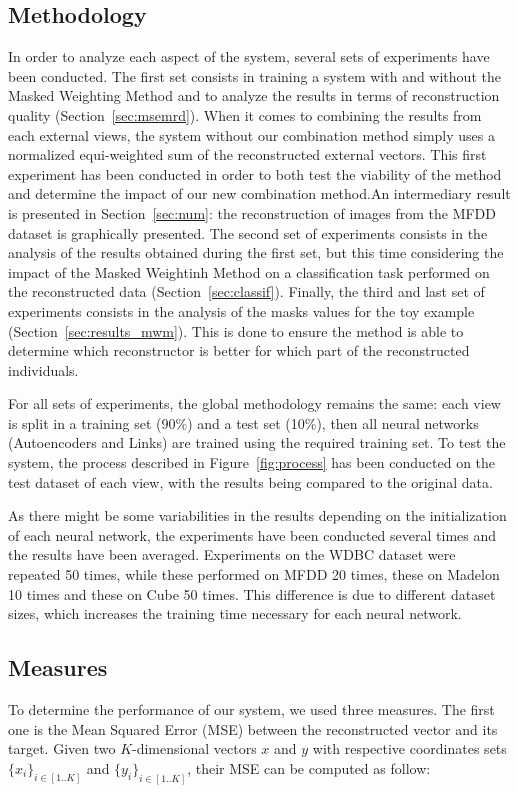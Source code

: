 	\subsection{Methodology}
\label{sec:methodo}
In order to analyze each aspect of the system, several sets of experiments have been conducted.	The first set consists in training a system with and without the Masked Weighting Method and to analyze the results in terms of reconstruction quality (Section~\ref{sec:msemrd}). When it comes to combining the results from each external views, the system without our combination method simply uses a normalized equi-weighted sum of the reconstructed external vectors. This first experiment has been conducted in order to both test the viability of the method and determine the impact of our new combination method.\@ An intermediary result is presented in Section~\ref{sec:num}: the reconstruction of images from the MFDD dataset is graphically presented. The second set of experiments consists in the analysis of the results obtained during the first set, but this time considering the impact of the Masked Weightinh Method on a classification task performed on the reconstructed data (Section~\ref{sec:classif}). Finally, the third and last set of experiments consists in the analysis of the masks values for the toy example (Section~\ref{sec:results_mwm}). This is done to ensure the method is able to determine which reconstructor is better for which part of the reconstructed individuals.
	
For all sets of experiments, the global methodology remains the same: each view is split in a training set (90\%) and a test set (10\%), then all neural networks (Autoencoders and Links) are trained using the required training set. To test the system, the process described in Figure~\ref{fig:process} has been conducted on the test dataset of each view, with the results being compared to the original data.
	
As there might be some variabilities in the results depending on the initialization of each neural network, the experiments have been conducted several times and the results have been averaged. Experiments on the WDBC dataset were repeated 50 times, while these performed on MFDD 20 times, these on Madelon 10 times and these on Cube 50 times. This difference is due to different dataset sizes, which increases the training time necessary for each neural network.
	
	\subsection{Measures}
\label{sec:measures}
To determine the performance of our system, we used three measures. The first one is the Mean Squared Error (MSE) between the reconstructed vector and its target. Given two $K$-dimensional vectors $x$ and $y$ with respective coordinates sets ${\{x_i\}}_{i \in [1..K]}$ and ${\{y_i\}}_{i \in [1..K]}$, their MSE can be computed as follow:
	
